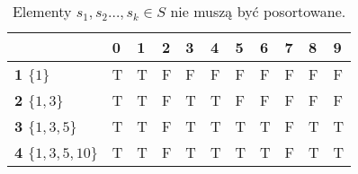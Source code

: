 \begin{table}[H]
	\center
	\begin{tabular}{|l|l|l|l|l|l|l|l|l|l|l|}
		\hline
		& \multicolumn{1}{l|}{\textbf{0}} & \multicolumn{1}{l|}{\textbf{1}} & \multicolumn{1}{l|}{\textbf{2}} & \multicolumn{1}{l|}{\textbf{3}} & \multicolumn{1}{l|}{\textbf{4}} & \multicolumn{1}{l|}{\textbf{5}} & \multicolumn{1}{l|}{\textbf{6}} & \multicolumn{1}{l|}{\textbf{7}} & \multicolumn{1}{l|}{\textbf{8}} & \multicolumn{1}{l|}{\textbf{9}} \\ \hline
		\textbf{1 $\{1\}$} & \color{ForestGreen}T                               & \color{ForestGreen}T                                & F                               & F                               & F                               & F                               & F                               & F                               & F                               & F                               \\ \cline{1-1}
		\textbf{2 $\{1, 3\}$} & \color{ForestGreen}T                                & \color{ForestGreen}T                                & F                               & \color{ForestGreen}T                                & \color{ForestGreen}T                                & F                               & F                               & F                               & F                               & F                               \\ \cline{1-1}
		\textbf{3 $\{1, 3, 5\}$} & \color{ForestGreen}T                                & \color{ForestGreen}T                                & F                               & \color{ForestGreen}T                                & \color{ForestGreen}T                                & \color{ForestGreen}T                                & \color{ForestGreen}T                                & F                               & \color{ForestGreen}T                                & \color{ForestGreen}T                                \\ \cline{1-1}
		\textbf{4 $\{1, 3, 5, 10\}$} & \color{ForestGreen}T                                & \color{ForestGreen}T                                & F                               & \color{ForestGreen}T                                & \color{ForestGreen}T                                & \color{ForestGreen}T                                & \color{ForestGreen}T                                & F                               & \color{ForestGreen}T                                & \color{ForestGreen}T                                 \\ \cline{1-1}
		\hline
	\end{tabular}
	\caption{Elementy $s_1, s_2 \dots, s_k \in S$ nie muszą być posortowane.}
\end{table}

